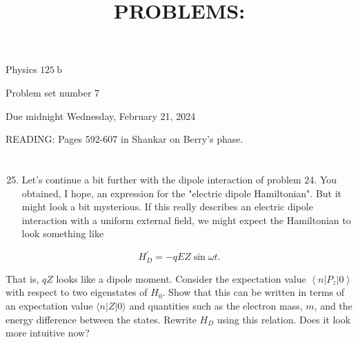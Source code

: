 \documentclass[12pt]{article}
\title{PROBLEMS: }
\author{}
\date{}
\begin{document}
\maketitle
Physics $125 \mathrm{~b}$

Problem set number 7

Due midnight Wednesday, February 21, 2024

READING: Pages 592-607 in Shankar on Berry's phase.
\section{}
\begin{enumerate}
  \setcounter{enumi}{24}
  \item Let's continue a bit further with the dipole interaction of problem 24. You obtained, I hope, an expression for the "electric dipole Hamiltonian". But it might look a bit mysterious. If this really describes an electric dipole interaction with a uniform external field, we might expect the Hamiltonian to look something like
\end{enumerate}


\begin{equation*}
H_{D}^{\prime}=-q E Z \sin \omega t . \tag{1}
\end{equation*}


That is, $q Z$ looks like a dipole moment. Consider the expectation value $\left\langle n\left|P_{z}\right| 0\right\rangle$ with respect to two eigenstates of $H_{0}$. Show that this can be written in terms of an expectation value $\langle n|Z| 0\rangle$ and quantities such as the electron mass, $m$, and the energy difference between the states. Rewrite $H_{D}$ using this relation. Does it look more intuitive now?
\end{document}
